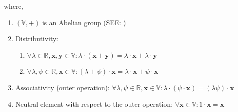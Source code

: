 where,
\begin{enumerate}[itemsep=0.2cm]
    \item $(\mathbb{V}, +)$ is an Abelian group (SEE: )
    \item Distributivity:
    \begin{enumerate}
        \item $\forall \lambda \in \mathbb{R}, \mathbf{x,y}\in \mathbb{V} : \lambda\cdot(\mathbf{x+y}) = \lambda\cdot\mathbf{x} + \lambda\cdot\mathbf{y}$
        
        \item $\forall \lambda,\psi \in \mathbb{R}, \textbf{x}\in \mathbb{V} : (\lambda + \psi) \cdot\textbf{x} = \lambda\cdot\textbf{x} + \psi\cdot\textbf{x}$
        
    \end{enumerate}

    \item Associativity (outer operation): $\forall \lambda,\psi\in\mathbb{R}, \mathbf{x}\in\mathbb{V}: \lambda\cdot(\psi\cdot\mathbf{x}) = (\lambda\psi)\cdot\mathbf{x}$

    \item Neutral element with respect to the outer operation: $\forall \mathbf{x}\in\mathbb{V}:1\cdot\mathbf{x}=\mathbf{x}$
\end{enumerate}
\vspace{0.3cm}

